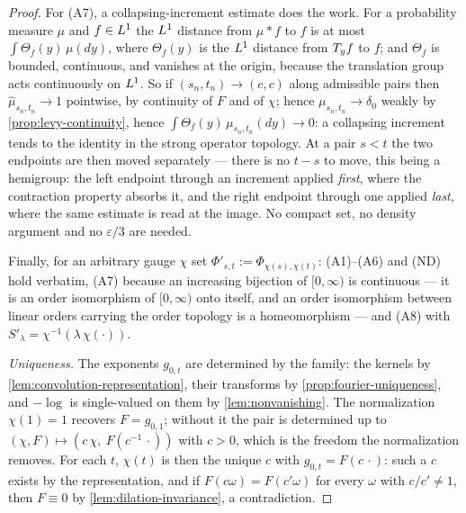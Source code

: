 \begin{proof}
For (A7), a collapsing-increment estimate does the work. For a probability measure $\mu$ and
$f \in L^1$ the $L^1$ distance from $\mu * f$ to $f$ is at most $\int \Theta_f(y)\,\mu(dy)$,
where $\Theta_f(y)$ is the $L^1$ distance from $T_{y}f$ to $f$; and $\Theta_f$ is bounded,
continuous, and vanishes at the origin, because the translation group acts continuously on
$L^1$. So if $(s_n,t_n) \to (c,c)$ along admissible pairs then $\hat\mu_{s_n,t_n} \to 1$
pointwise, by continuity of $F$ and of $\chi$; hence $\mu_{s_n,t_n} \to \delta_0$ weakly by
\ref{prop:levy-continuity}, hence $\int \Theta_f(y)\,\mu_{s_n,t_n}(dy) \to 0$: a collapsing increment
tends to the identity in the strong operator topology. At a pair $s < t$ the two endpoints are
then moved separately --- there is no $t - s$ to move, this being a hemigroup: the left endpoint
through an increment applied \emph{first}, where the contraction property absorbs it, and the
right endpoint through one applied \emph{last}, where the same estimate is read at the image.
No compact set, no density argument and no $\varepsilon/3$ are needed.

Finally, for an arbitrary gauge $\chi$ set $\Phi'_{s,t} := \Phi_{\chi(s),\chi(t)}$: (A1)--(A6)
and (ND) hold verbatim, (A7) because an increasing bijection of $[0,\infty)$ is continuous ---
it is an order isomorphism of $[0,\infty)$ onto itself, and an order isomorphism between linear
orders carrying the order topology is a homeomorphism --- and (A8) with
$S'_\lambda = \chi^{-1}(\lambda\,\chi(\cdot))$.

\emph{Uniqueness.} The exponents $g_{0,t}$ are determined by the family: the kernels by
\ref{lem:convolution-representation}, their transforms by \ref{prop:fourier-uniqueness}, and
$-\log$ is single-valued on them by \ref{lem:nonvanishing}. The normalization $\chi(1) = 1$
recovers $F = g_{0,1}$; without it the pair is determined up to
$(\chi,F) \mapsto (c\,\chi,\ F(c^{-1}\,\cdot))$ with $c > 0$, which is the freedom the
normalization removes. For each $t$, $\chi(t)$ is then the unique $c$ with
$g_{0,t} = F(c\,\cdot)$: such a $c$ exists by the representation, and if
$F(c\omega) = F(c'\omega)$ for every $\omega$ with $c/c' \ne 1$, then $F \equiv 0$ by
\ref{lem:dilation-invariance}, a contradiction.
\end{proof}

